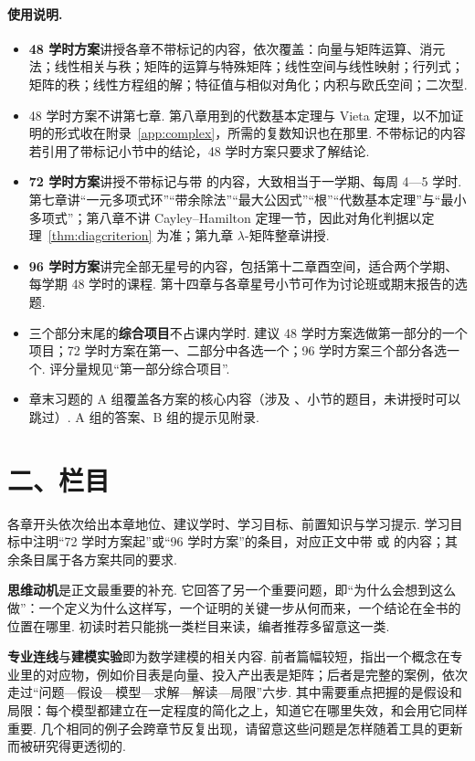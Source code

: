 \paragraph*{使用说明.}
\begin{itemize}
	\item \textbf{48 学时方案}讲授各章不带标记的内容，依次覆盖：向量与矩阵运算、消元法；线性相关与秩；矩阵的运算与特殊矩阵；线性空间与线性映射；行列式；矩阵的秩；线性方程组的解；特征值与相似对角化；内积与欧氏空间；二次型. 
	\item 48 学时方案不讲第七章. 第八章用到的代数基本定理与 Vieta 定理，以不加证明的形式收在附录~\ref{app:complex}，所需的复数知识也在那里. 不带标记的内容若引用了带标记小节中的结论，48 学时方案只要求了解结论.
	\item \textbf{72 学时方案}讲授不带标记与带 \textdagger 的内容，大致相当于一学期、每周 4—5 学时. 第七章讲“一元多项式环”“带余除法”“最大公因式”“根”“代数基本定理”与“最小多项式”；第八章不讲 Cayley–Hamilton 定理一节，因此对角化判据以定理~\ref{thm:diagcriterion} 为准；第九章 $\lambda$-矩阵整章讲授.
	\item \textbf{96 学时方案}讲完全部无星号的内容，包括第十二章酉空间，适合两个学期、每学期 48 学时的课程. 第十四章与各章星号小节可作为讨论班或期末报告的选题.
	\item 三个部分末尾的\textbf{综合项目}不占课内学时. 建议 48 学时方案选做第一部分的一个项目；72 学时方案在第一、二部分中各选一个；96 学时方案三个部分各选一个. 评分量规见“第一部分综合项目”.
	\item 章末习题的 A 组覆盖各方案的核心内容（涉及 \textdagger、\textdaggerdbl 小节的题目，未讲授时可以跳过）. A 组的答案、B 组的提示见附录.
\end{itemize}


\section*{二、栏目}

各章开头依次给出本章地位、建议学时、学习目标、前置知识与学习提示. 学习目标中注明“72 学时方案起”或“96 学时方案”的条目，对应正文中带 \textdagger 或 \textdaggerdbl 的内容；其余条目属于各方案共同的要求.

\textbf{思维动机}是正文最重要的补充. 它回答了另一个重要问题，即“为什么会想到这么做”：一个定义为什么这样写，一个证明的关键一步从何而来，一个结论在全书的位置在哪里. 初读时若只能挑一类栏目来读，编者推荐多留意这一类.

\textbf{专业连线}与\textbf{建模实验}即为数学建模的相关内容. 前者篇幅较短，指出一个概念在专业里的对应物，例如价目表是向量、投入产出表是矩阵；后者是完整的案例，依次走过“问题—假设—模型—求解—解读—局限”六步. 其中需要重点把握的是假设和局限：每个模型都建立在一定程度的简化之上，知道它在哪里失效，和会用它同样重要. 几个相同的例子会跨章节反复出现，请留意这些问题是怎样随着工具的更新而被研究得更透彻的.


